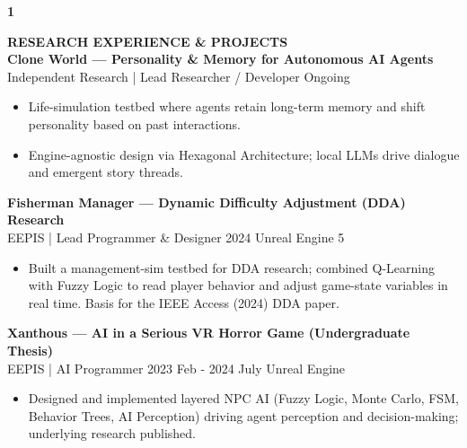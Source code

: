 \documentclass[11pt,a4paper]{article}
\begin{document}
\hspace{1cm}
\begin{minipage}[t]{18cm}

\begin{minipage}[t]{0.8cm}
{\Large\bfseries 1}
\end{minipage}%
\begin{minipage}[t]{17cm}
{\large\bfseries RESEARCH EXPERIENCE \& PROJECTS}\\[8pt]

\textbf{Clone World --- Personality \& Memory for Autonomous AI Agents}\\
{\small Independent Research | Lead Researcher / Developer \textbar{} Ongoing}
\begin{itemize}[leftmargin=*, nosep, itemsep=2pt, topsep=2pt]
    \item Life-simulation testbed where agents retain long-term memory and shift personality based on past interactions.
    \item Engine-agnostic design via Hexagonal Architecture; local LLMs drive dialogue and emergent story threads.
\end{itemize}

\vspace{0.3cm}

\textbf{Fisherman Manager --- Dynamic Difficulty Adjustment (DDA) Research}\\
{\small EEPIS | Lead Programmer \& Designer \textbar{} 2024 \textbar{} Unreal Engine 5}
\begin{itemize}[leftmargin=*, nosep, itemsep=2pt, topsep=2pt]
    \item Built a management-sim testbed for DDA research; combined Q-Learning with Fuzzy Logic to read player behavior and adjust game-state variables in real time. Basis for the IEEE Access (2024) DDA paper.
\end{itemize}

\vspace{0.3cm}

\textbf{Xanthous --- AI in a Serious VR Horror Game (Undergraduate Thesis)}\\
{\small EEPIS | AI Programmer \textbar{} 2023 Feb - 2024 July \textbar{} Unreal Engine}
\begin{itemize}[leftmargin=*, nosep, itemsep=2pt, topsep=2pt]
    \item Designed and implemented layered NPC AI (Fuzzy Logic, Monte Carlo, FSM, Behavior Trees, AI Perception) driving agent perception and decision-making; underlying research published.
\end{itemize}


\end{minipage}
\end{minipage}
\end{document}
